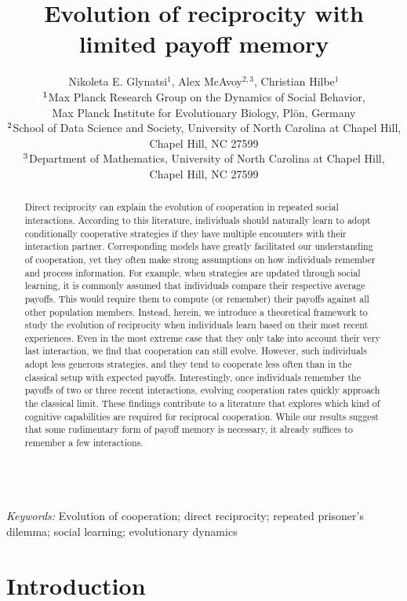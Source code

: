 \documentclass[11pt]{article}
\title{\bf  \sffamily \Large Evolution of reciprocity %
with limited payoff memory\\}
\date{}
\author{\parbox[c]{16cm}{\centering \onehalfspacing 
Nikoleta E. Glynatsi$^1$,  Alex McAvoy$^{2,3}$, Christian Hilbe$^1$\\
$^{\rm 1}$Max Planck Research Group on the Dynamics of Social Behavior,\\ Max Planck Institute for Evolutionary Biology, Pl\"{o}n, Germany \\
$^{\rm 2}$School of Data Science and Society, University of North Carolina at Chapel Hill,\\ Chapel Hill, NC 27599 \\
$^{\rm 3}$Department of Mathematics, University of North Carolina at Chapel Hill,\\ Chapel Hill, NC 27599}}
\theoremstyle{plainCl1}
\theoremstyle{plainCl2}
\begin{document}
\maketitle


\begin{abstract}
\noindent
Direct reciprocity can explain the evolution of cooperation in repeated social interactions. 
According to this literature, individuals should naturally learn to adopt conditionally cooperative strategies if they have multiple encounters with their interaction partner. 
Corresponding models have greatly facilitated our understanding of cooperation, yet they often make strong assumptions on how individuals remember and process information. 
For example, when strategies are updated through social learning, it is commonly assumed that individuals compare their respective average payoffs.  
This would require them to compute (or remember) their payoffs against all other population members.
Instead, herein, we introduce a theoretical framework to study the evolution of reciprocity when individuals learn based on their most recent experiences.
Even in the most extreme case that they only take into account their very last interaction, we find that cooperation can still evolve. 
However, such individuals adopt less generous strategies, and they tend to cooperate less often than in the classical setup with expected payoffs. 
Interestingly, once individuals remember the payoffs of two or three recent interactions, evolving cooperation rates quickly approach the classical limit. 
These findings contribute to a literature that explores which kind of cognitive capabilities are required for reciprocal cooperation. 
While our results suggest that some rudimentary form of payoff memory is necessary, it already suffices to remember a few interactions.\end{abstract}

~\\
{\it Keywords:} Evolution of cooperation; direct reciprocity; repeated prisoner's dilemma; social learning; evolutionary dynamics



\clearpage
\newpage



\section{Introduction}

\end{document}
